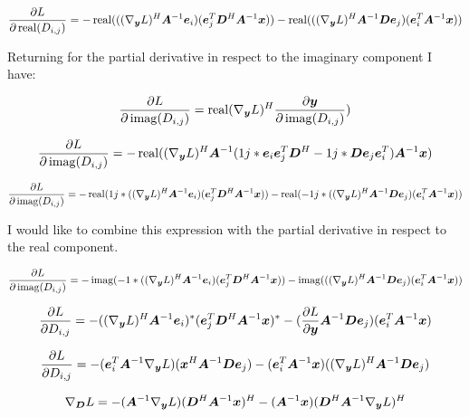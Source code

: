 \documentclass{article}
\begin{document}
\begin{equation}
\frac{\partial L}{\partial \operatorname{real}(D_{i,j})} = -\operatorname{real}(((\nabla_{\bm{y}} L)^H\bm{A}^{-1}\bm{e}_i)(\bm{e}_j^T\bm{D}^H\bm{A}^{-1}\bm{x})) - \operatorname{real}(((\nabla_{\bm{y}} L)^H\bm{A}^{-1}\bm{D}\bm{e}_j)(\bm{e}_i^T\bm{A}^{-1}\bm{x}))
\end{equation}

Returning for the partial derivative in respect to the imaginary component
I have:

\begin{equation}
\frac{\partial L}{\partial \operatorname{imag}(D_{i,j})} = \operatorname{real}(\nabla_{\bm{y}} L)^H\frac{\partial \bm{y}}{\partial \operatorname{imag}(D_{i,j})})
\end{equation}

\begin{equation}
\frac{\partial L}{\partial \operatorname{imag}(D_{i,j})} = -\operatorname{real}((\nabla_{\bm{y}} L)^H\bm{A}^{-1}(1j*\bm{e}_i\bm{e}_j^T\bm{D}^H - 1j*\bm{D}\bm{e}_j\bm{e}_i^T)\bm{A}^{-1}\bm{x})
\end{equation}

\begin{equation}
\frac{\partial L}{\partial \operatorname{imag}(D_{i,j})} = -\operatorname{real}(1j*((\nabla_{\bm{y}} L)^H\bm{A}^{-1}\bm{e}_i)(\bm{e}_j^T\bm{D}^H\bm{A}^{-1}\bm{x})) - \operatorname{real}(-1j*((\nabla_{\bm{y}} L)^H\bm{A}^{-1}\bm{D}\bm{e}_j)(\bm{e}_i^T\bm{A}^{-1}\bm{x}))
\end{equation}

I would like to combine this expression with the partial derivative in respect to the real component.

\begin{equation}
\frac{\partial L}{\partial \operatorname{imag}(D_{i,j})} = -\operatorname{imag}(-1*((\nabla_{\bm{y}} L)^H\bm{A}^{-1}\bm{e}_i)(\bm{e}_j^T\bm{D}^H\bm{A}^{-1}\bm{x})) - \operatorname{imag}(((\nabla_{\bm{y}} L)^H\bm{A}^{-1}\bm{D}\bm{e}_j)(\bm{e}_i^T\bm{A}^{-1}\bm{x}))
\end{equation}

\begin{equation}
\frac{\partial L}{\partial D_{i,j}} = -((\nabla_{\bm{y}} L)^H\bm{A}^{-1}\bm{e}_i)^*(\bm{e}_j^T\bm{D}^H\bm{A}^{-1}\bm{x})^* - (\frac{\partial L}{\partial \bm{y}}\bm{A}^{-1}\bm{D}\bm{e}_j)(\bm{e}_i^T\bm{A}^{-1}\bm{x})
\end{equation}

\begin{equation}
\frac{\partial L}{\partial D_{i,j}} = -(\bm{e}_i^T\bm{A}^{-1}\nabla_{\bm{y}} L)(\bm{x}^H\bm{A}^{-1}\bm{D}\bm{e}_j) - (\bm{e}_i^T\bm{A}^{-1}\bm{x})((\nabla_{\bm{y}} L)^H\bm{A}^{-1}\bm{D}\bm{e}_j)
\end{equation}


\begin{equation}
\nabla_{\bm{D}} L = -(\bm{A}^{-1}\nabla_{\bm{y}} L)(\bm{D}^H\bm{A}^{-1}\bm{x})^H - (\bm{A}^{-1}\bm{x})(\bm{D}^H\bm{A}^{-1}\nabla_{\bm{y}} L)^H
\end{equation}
\end{document}
